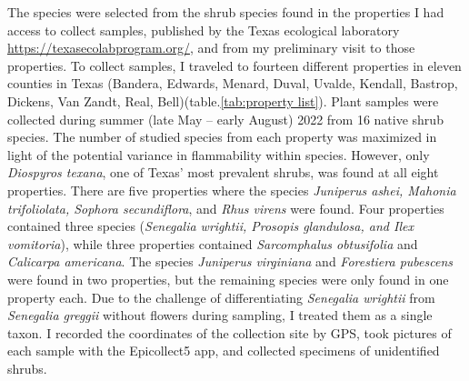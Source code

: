 \documentclass{ttuthes2007}
\begin{document}
The species were selected from the shrub species found in the properties I had access to collect samples, published by the Texas ecological laboratory  \url{https://texasecolabprogram.org/}, and from my preliminary visit to those properties. To collect samples, I traveled to fourteen different properties in eleven counties in Texas (Bandera, Edwards, Menard, Duval, Uvalde, Kendall, Bastrop, Dickens, Van Zandt, Real, Bell)(table.\ref{tab:property list}).   %
Plant samples were collected during summer (late May -- early August) 2022 from 16 native shrub species. The number of studied species from each property was maximized in light of the potential variance in flammability within species. However, only \emph{Diospyros texana}, one of Texas' most prevalent shrubs, was found at all eight properties. There are five properties where the species \emph{Juniperus ashei, Mahonia trifoliolata, Sophora secundiflora}, and \emph{Rhus virens} were found. Four properties contained three species (\emph{Senegalia wrightii, Prosopis glandulosa, and Ilex vomitoria}), while three properties contained \emph{Sarcomphalus obtusifolia} \citep{hauenschild2016phylogenetic} and \emph{Calicarpa americana}. The species \emph{Juniperus virginiana} and \emph{Forestiera pubescens} were found in two properties, but the remaining species were only found in one property each. %
 Due to the challenge of differentiating \emph{Senegalia wrightii} from \emph{Senegalia greggii} without flowers during sampling, I treated them as a single taxon. I recorded the coordinates of the collection site by GPS, took pictures of each sample with the Epicollect5 app, and collected specimens of unidentified shrubs.
\end{document}
